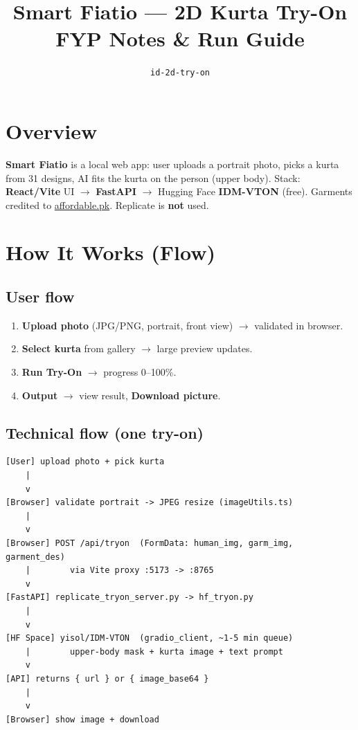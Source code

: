 \documentclass[10pt,a4paper]{article}
\title{\textbf{Smart Fiatio --- 2D Kurta Try-On}\\[0.2em]\large FYP Notes \& Run Guide}
\author{\texttt{id-2d-try-on}}
\date{}
\begin{document}
\maketitle
\vspace{-1.5em}

\section{Overview}
\textbf{Smart Fiatio} is a local web app: user uploads a portrait photo, picks a kurta from 31 designs, AI fits the kurta on the person (upper body). Stack: \textbf{React/Vite} UI $\rightarrow$ \textbf{FastAPI} $\rightarrow$ Hugging Face \textbf{IDM-VTON} (free). Garments credited to \href{https://www.affordable.pk/}{affordable.pk}. Replicate is \textbf{not} used.

\section{How It Works (Flow)}

\subsection{User flow}
\begin{enumerate}[label=\textbf{\arabic*.}]
  \item \textbf{Upload photo} (JPG/PNG, portrait, front view) $\rightarrow$ validated in browser.
  \item \textbf{Select kurta} from gallery $\rightarrow$ large preview updates.
  \item \textbf{Run Try-On} $\rightarrow$ progress 0--100\%.
  \item \textbf{Output} $\rightarrow$ view result, \textbf{Download picture}.
\end{enumerate}

\subsection{Technical flow (one try-on)}
\begin{verbatim}
[User] upload photo + pick kurta
    |
    v
[Browser] validate portrait -> JPEG resize (imageUtils.ts)
    |
    v
[Browser] POST /api/tryon  (FormData: human_img, garm_img, garment_des)
    |        via Vite proxy :5173 -> :8765
    v
[FastAPI] replicate_tryon_server.py -> hf_tryon.py
    |
    v
[HF Space] yisol/IDM-VTON  (gradio_client, ~1-5 min queue)
    |        upper-body mask + kurta image + text prompt
    v
[API] returns { url } or { image_base64 }
    |
    v
[Browser] show image + download
\end{verbatim}
\end{document}
